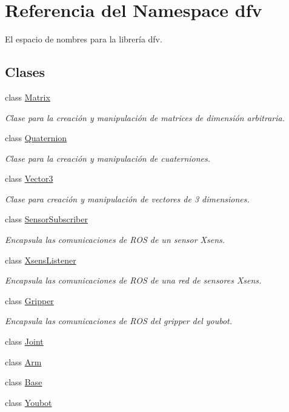 \hypertarget{namespacedfv}{\section{\-Referencia del \-Namespace dfv}
\label{namespacedfv}
}


\-El espacio de nombres para la librería dfv.  


\subsection*{\-Clases}
\begin{DoxyCompactItemize}
\item 
class \hyperlink{classdfv_1_1Matrix}{\-Matrix}
\begin{DoxyCompactList}\small\item\em \-Clase para la creación y manipulación de matrices de dimensión arbitraria. \end{DoxyCompactList}\item 
class \hyperlink{classdfv_1_1Quaternion}{\-Quaternion}
\begin{DoxyCompactList}\small\item\em \-Clase para la creación y manipulación de cuaterniones. \end{DoxyCompactList}\item 
class \hyperlink{classdfv_1_1Vector3}{\-Vector3}
\begin{DoxyCompactList}\small\item\em \-Clase para creación y manipulación de vectores de 3 dimensiones. \end{DoxyCompactList}\item 
class \hyperlink{classdfv_1_1SensorSubscriber}{\-Sensor\-Subscriber}
\begin{DoxyCompactList}\small\item\em \-Encapsula las comunicaciones de \-R\-O\-S de un sensor \-Xsens. \end{DoxyCompactList}\item 
class \hyperlink{classdfv_1_1XsensListener}{\-Xsens\-Listener}
\begin{DoxyCompactList}\small\item\em \-Encapsula las comunicaciones de \-R\-O\-S de una red de sensores \-Xsens. \end{DoxyCompactList}\item 
class \hyperlink{classdfv_1_1Gripper}{\-Gripper}
\begin{DoxyCompactList}\small\item\em \-Encapsula las comunicaciones de \-R\-O\-S del gripper del youbot. \end{DoxyCompactList}\item 
class \hyperlink{classdfv_1_1Joint}{\-Joint}
\item 
class \hyperlink{classdfv_1_1Arm}{\-Arm}
\item 
class \hyperlink{classdfv_1_1Base}{\-Base}
\item 
class \hyperlink{classdfv_1_1Youbot}{\-Youbot}
\end{DoxyCompactItemize}
